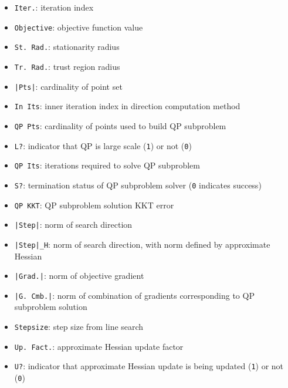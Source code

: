 \documentclass{article}
\begin{document}
\begin{itemize}
  \item \texttt{Iter.}: iteration index
  \item \texttt{Objective}: objective function value
  \item \texttt{St. Rad.}: stationarity radius
  \item \texttt{Tr. Rad.}: trust region radius
  \item \texttt{|Pts|}: cardinality of point set
  \item \texttt{In Its}: inner iteration index in direction computation method
  \item \texttt{QP Pts}: cardinality of points used to build QP subproblem
  \item \texttt{L?}: indicator that QP is large scale (\texttt{1}) or not (\texttt{0})
  \item \texttt{QP Its}: iterations required to solve QP subproblem
  \item \texttt{S?}: termination status of QP subproblem solver (\texttt{0} indicates success)
  \item \texttt{QP KKT}: QP subproblem solution KKT error
  \item \texttt{|Step|}: norm of search direction
  \item \texttt{|Step|\_H}: norm of search direction, with norm defined by approximate Hessian
  \item \texttt{|Grad.|}: norm of objective gradient
  \item \texttt{|G. Cmb.|}: norm of combination of gradients corresponding to QP subproblem solution
  \item \texttt{Stepsize}: step size from line search
  \item \texttt{Up. Fact.}: approximate Hessian update factor
  \item \texttt{U?}: indicator that approximate Hessian update is being updated (\texttt{1}) or not (\texttt{0})
\end{itemize}



\end{document}
